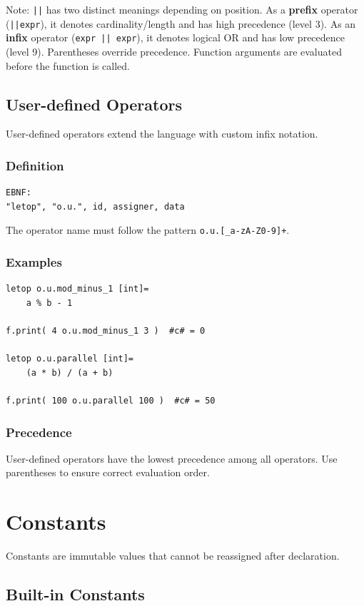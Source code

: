Note: \texttt{||} has two distinct meanings depending on position. As a \textbf{prefix} operator (\texttt{||expr}), it denotes cardinality/length and has high precedence (level 3). As an \textbf{infix} operator (\texttt{expr || expr}), it denotes logical OR and has low precedence (level 9). Parentheses override precedence. Function arguments are evaluated before the function is called.

\section{User-defined Operators}
User-defined operators extend the language with custom infix notation.

\subsection{Definition}
\begin{verbatim}
EBNF:
"letop", "o.u.", id, assigner, data
\end{verbatim}

The operator name must follow the pattern \texttt{o.u.[\_a-zA-Z0-9]+}.

\subsection{Examples}
\begin{verbatim}
letop o.u.mod_minus_1 [int]= 
    a % b - 1

f.print( 4 o.u.mod_minus_1 3 )  #c# = 0

letop o.u.parallel [int]= 
    (a * b) / (a + b)

f.print( 100 o.u.parallel 100 )  #c# = 50
\end{verbatim}

\subsection{Precedence}
User-defined operators have the lowest precedence among all operators. Use parentheses to ensure correct evaluation order.



\chapter{Constants}
Constants are immutable values that cannot be reassigned after declaration.

\section{Built-in Constants}
